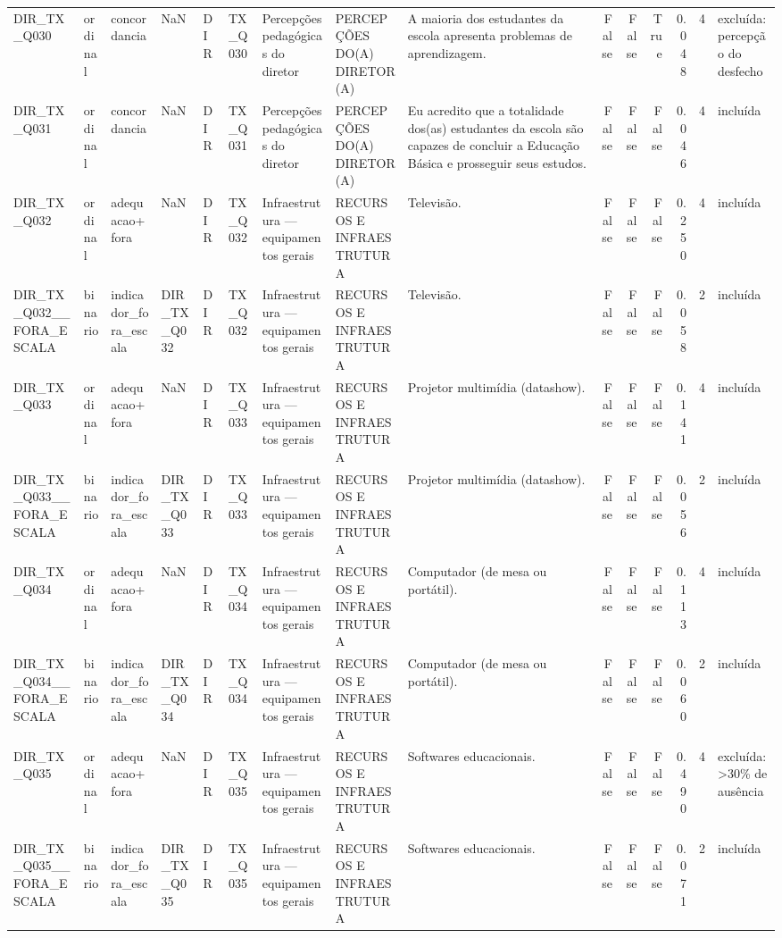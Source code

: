 \begin{tabular}{lllllllllrrrrrl}
DIR\_TX\_Q030 & ordinal & concordancia & NaN & DIR & TX\_Q030 & Percepções pedagógicas do diretor & PERCEPÇÕES DO(A) DIRETOR(A) & A maioria dos estudantes da escola apresenta problemas de aprendizagem. & False & False & True & 0.048 & 4 & excluída: percepção do desfecho \\
DIR\_TX\_Q031 & ordinal & concordancia & NaN & DIR & TX\_Q031 & Percepções pedagógicas do diretor & PERCEPÇÕES DO(A) DIRETOR(A) & Eu acredito que a totalidade dos(as) estudantes da escola são capazes de concluir a Educação Básica e prosseguir seus estudos. & False & False & False & 0.046 & 4 & incluída \\
DIR\_TX\_Q032 & ordinal & adequacao+fora & NaN & DIR & TX\_Q032 & Infraestrutura — equipamentos gerais & RECURSOS E INFRAESTRUTURA & Televisão. & False & False & False & 0.250 & 4 & incluída \\
DIR\_TX\_Q032\_\_FORA\_ESCALA & binario & indicador\_fora\_escala & DIR\_TX\_Q032 & DIR & TX\_Q032 & Infraestrutura — equipamentos gerais & RECURSOS E INFRAESTRUTURA & Televisão. & False & False & False & 0.058 & 2 & incluída \\
DIR\_TX\_Q033 & ordinal & adequacao+fora & NaN & DIR & TX\_Q033 & Infraestrutura — equipamentos gerais & RECURSOS E INFRAESTRUTURA & Projetor multimídia (datashow). & False & False & False & 0.141 & 4 & incluída \\
DIR\_TX\_Q033\_\_FORA\_ESCALA & binario & indicador\_fora\_escala & DIR\_TX\_Q033 & DIR & TX\_Q033 & Infraestrutura — equipamentos gerais & RECURSOS E INFRAESTRUTURA & Projetor multimídia (datashow). & False & False & False & 0.056 & 2 & incluída \\
DIR\_TX\_Q034 & ordinal & adequacao+fora & NaN & DIR & TX\_Q034 & Infraestrutura — equipamentos gerais & RECURSOS E INFRAESTRUTURA & Computador (de mesa ou portátil). & False & False & False & 0.113 & 4 & incluída \\
DIR\_TX\_Q034\_\_FORA\_ESCALA & binario & indicador\_fora\_escala & DIR\_TX\_Q034 & DIR & TX\_Q034 & Infraestrutura — equipamentos gerais & RECURSOS E INFRAESTRUTURA & Computador (de mesa ou portátil). & False & False & False & 0.060 & 2 & incluída \\
DIR\_TX\_Q035 & ordinal & adequacao+fora & NaN & DIR & TX\_Q035 & Infraestrutura — equipamentos gerais & RECURSOS E INFRAESTRUTURA & Softwares educacionais. & False & False & False & 0.490 & 4 & excluída: >30\% de ausência \\
DIR\_TX\_Q035\_\_FORA\_ESCALA & binario & indicador\_fora\_escala & DIR\_TX\_Q035 & DIR & TX\_Q035 & Infraestrutura — equipamentos gerais & RECURSOS E INFRAESTRUTURA & Softwares educacionais. & False & False & False & 0.071 & 2 & incluída \\

\end{tabular}
